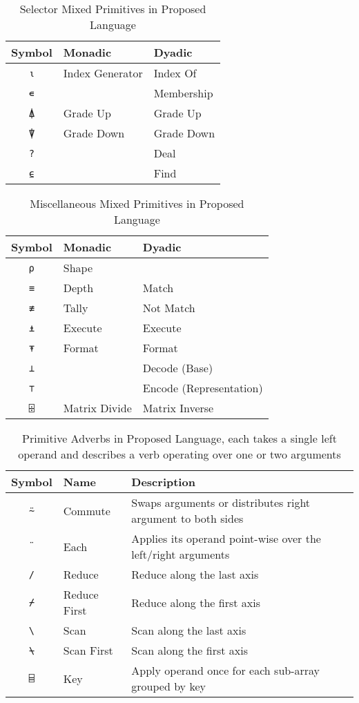 \documentclass[numbers,preprint]{sigplanconf}
\begin{document}
\begin{table}
\centering
\begin{tabular}{cll}
\toprule
Symbol     & Monadic         & Dyadic \\
\midrule
\texttt{⍳} & Index Generator & Index Of \\
\texttt{∊} &                 & Membership \\
\texttt{⍋} & Grade Up        & Grade Up \\
\texttt{⍒} & Grade Down      & Grade Down \\
\texttt{?} &                 & Deal \\
\texttt{⍷} &                 & Find \\
\end{tabular}
\caption{Selector Mixed Primitives in Proposed Language}
\label{tab:seltorprims}
\end{table}

\begin{table}
\centering
\begin{tabular}{cll}
\toprule
Symbol     & Monadic       & Dyadic \\
\midrule
\texttt{⍴} & Shape         & \\
\texttt{≡} & Depth         & Match \\
\texttt{≢} & Tally         & Not Match \\
\texttt{⍎} & Execute       & Execute \\
\texttt{⍕} & Format        & Format \\
\texttt{⊥} &               & Decode (Base) \\
\texttt{⊤} &               & Encode (Representation) \\
\texttt{⌹} & Matrix Divide & Matrix Inverse \\
\end{tabular}
\caption{Miscellaneous Mixed Primitives in Proposed Language}
\label{tab:miscprims}
\end{table}

\begin{table*}
\centering
\begin{tabular}{cll}
\toprule
Symbol     & Name & Description \\
\midrule
\texttt{⍨} & Commute & Swaps arguments or distributes
 right argument to both sides \\
\texttt{¨} & Each & Applies its operand point-wise over the left/right
 arguments \\
\texttt{/} & Reduce & Reduce along the last axis \\
\texttt{⌿} & Reduce First & Reduce along the first axis \\
\texttt{\textbackslash} & Scan & Scan along the last axis \\
\texttt{⍀} & Scan First & Scan along the first axis \\
\texttt{⌸} & Key & Apply operand once for each sub-array grouped by key \\
\end{tabular}
\caption{Primitive Adverbs in Proposed Language, each takes a single left
operand and describes a verb operating over one or two arguments}
\label{tab:adverbs}
\end{table*}
\end{document}
